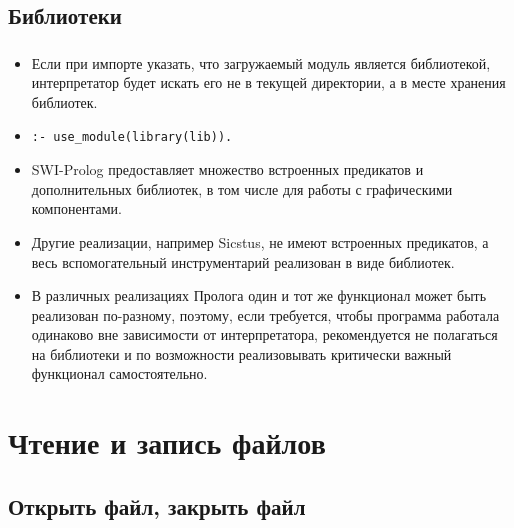 \subsection{Библиотеки}


\begin{frame}

	\frametitle{\insertsection}
	\framesubtitle{\insertsubsection}
	
	\begin{itemize}
		\item Если при импорте указать, что загружаемый модуль является библиотекой, интерпретатор будет искать его не в текущей директории, а в
		месте хранения библиотек.
		\item \texttt{:- use\_module(library(lib)).}
		\item SWI-Prolog предоставляет множество встроенных предикатов и дополнительных библиотек, в том числе для работы с графическими компонентами.
		\item Другие реализации, например Sicstus, не имеют встроенных предикатов, а весь вспомогательный инструментарий реализован в виде библиотек.
		\item В различных реализациях Пролога один и тот же функционал может быть реализован по-разному, поэтому, если требуется, чтобы программа работала одинаково вне зависимости от интерпретатора, рекомендуется не полагаться на библиотеки и по возможности реализовывать критически важный функционал
		самостоятельно.
	\end{itemize}

\end{frame}


\section{Чтение и запись файлов}

\begin{frame}

	\begin{center}
		\Huge \insertsection
	\end{center}

\end{frame}

\subsection{Открыть файл, закрыть файл}


